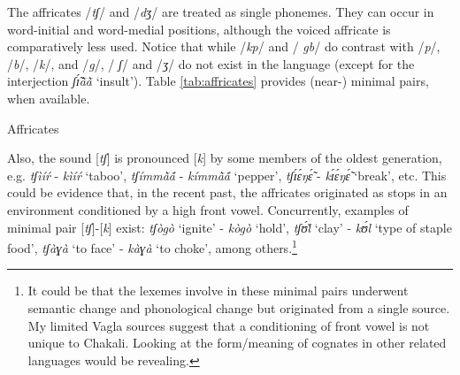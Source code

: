 The affricates /{\it tʃ}/ and  /{\it dʒ}/ are  treated as single phonemes. They 
can occur in word-initial and word-medial positions, although the voiced 
affricate is comparatively less used. Notice that while  /{\it kp}/ and /{\it 
gb}/ do contrast with /{\it p}/, /{\it b}/,  /{\it k}/,  and /{\it g}/,   /{\it 
ʃ}/ and  /{\it ʒ}/ do not exist in the language (except for the interjection 
{\it ʃɪ̃́ã̀ã̀}  `insult').  Table \ref{tab:affricates} provides (near-) minimal 
pairs, when available. 


\begin{table}[!htb] \small
\centering
\caption{Affricates\label{tab:affricates}}

\quad
{}
\end{table}

Also, the sound [{\it tʃ}] is pronounced [{\it k}]  by some members of the 
oldest generation, e.g. {\it tʃìíŕ} - {\it kìíŕ} `taboo',   {\it 
tʃímmã̀ã́} - {\it kímmã̀ã́} `pepper',  {\it tʃɪ́ɛ́ŋɛ̃́} -  {\it kɪ́ɛ́ŋɛ̃́} 
`break', etc.  This could be evidence that, in the  recent past, the affricates 
originated as  stops in an environment conditioned by a high front vowel.  
Concurrently,  examples of minimal pair [{\it tʃ}]-[{\it k}] exist:  {\it tʃògò} 
 `ignite' - {\it kògò} `hold', {\it tʃʊ́l̀} `clay' -  {\it kʊ́l} `type of staple 
food',  {\it tʃàɣà} `to face'  -  {\it kàɣà} `to choke',  among 
others.\footnote{It could be that the lexemes involve in these minimal pairs 
underwent semantic change and phonological change but originated from a single 
source.  My limited Vagla sources suggest that a conditioning of front vowel is 
not unique to Chakali. Looking at the form/meaning of cognates in other related 
languages would be revealing.}

